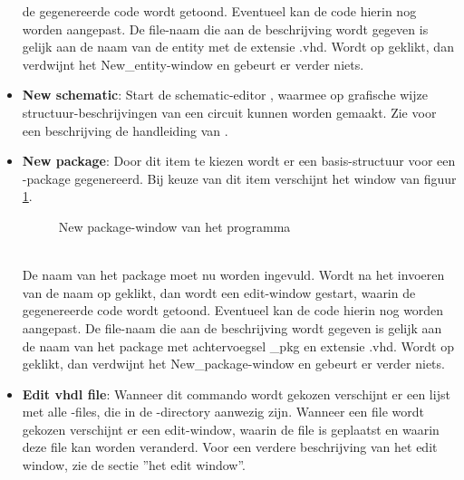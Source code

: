 \begin{itemize}
               de gegenereerde code wordt getoond. Eventueel kan de code
               hierin nog worden aangepast.
               De file-naam die aan de beschrijving wordt gegeven
               is gelijk aan de naam van de entity met de extensie .vhd.
               Wordt op  geklikt, dan verdwijnt het New\_entity-window
               en gebeurt er verder niets.
\item {\bf New schematic}: Start de schematic-editor ,
               waarmee op grafische wijze  structuur-beschrijvingen van een
               circuit kunnen worden gemaakt.
               Zie voor een beschrijving de handleiding van .
\item {\bf New package}: Door dit item te kiezen wordt er een basis-structuur voor
                   een -package gegenereerd.
                  Bij keuze van dit item verschijnt het window van
                  figuur \ref{newpack-window}.
                  \begin{figure}[htb]
                  \centerline{}
                  \caption{New package-window van het programma }
                  \label{newpack-window}
                  \end{figure}
                  \\
                  De naam van het package moet nu worden ingevuld.
                  Wordt na het invoeren van de naam
                  op  geklikt,  dan wordt een edit-window gestart, waarin
               de gegenereerde code wordt getoond. Eventueel kan de code
               hierin nog worden aangepast.
                 De file-naam die aan de beschrijving wordt gegeven
                 is gelijk aan de naam van het package met achtervoegsel \_pkg
                 en extensie .vhd.
                 Wordt op  geklikt, dan verdwijnt het New\_package-window
                 en gebeurt er verder niets.
\item {\bf Edit vhdl file}: Wanneer dit commando wordt gekozen verschijnt
                       er een lijst met alle -files, die in de -directory
                       aanwezig zijn. Wanneer een file wordt gekozen
                       verschijnt er een edit-window, waarin de file is
                       geplaatst en waarin deze file kan worden veranderd.
                       Voor een verdere beschrijving van het  edit window,
                       zie de sectie ''het  edit window''.

\end{itemize}
